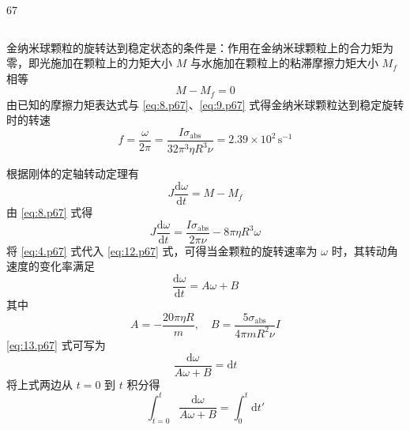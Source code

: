 \begin{solution}{67}
\begin{subsolution}
\begin{equation}
        \end{equation}
    \end{subsolution}
    \begin{subsolution}
        金纳米球颗粒的旋转达到稳定状态的条件是：作用在金纳米球颗粒上的合力矩为零，即光施加在颗粒上的力矩大小 $M$ 与水施加在颗粒上的粘滞摩擦力矩大小 $M_{f}$ 相等
        \begin{equation}
            M - M_{f} = 0 \label{eq:9.p67}
        \end{equation}
        由已知的摩擦力矩表达式与 \eqref{eq:8.p67}、\eqref{eq:9.p67} 式得金纳米球颗粒达到稳定旋转时的转速
        \begin{equation}
            f = \frac{\omega}{2\pi} = \frac{I\sigma_{\mathrm{abs}}}{32\pi^{3}\eta R^{3}\nu} = 2.39 \times 10^{2}\,\mathrm{s^{-1}} \label{eq:10.p67}
        \end{equation}
    \end{subsolution}
    \begin{subsolution}
        根据刚体的定轴转动定理有
        \begin{equation}
            J \frac{\mathrm{d}\omega}{\mathrm{d}t} = M - M_{f} \label{eq:11.p67}
        \end{equation}
        由 \eqref{eq:8.p67} 式得
        \begin{equation}
            J \frac{\mathrm{d}\omega}{\mathrm{d}t} = \frac{I\sigma_{\mathrm{abs}}}{2\pi\nu} - 8\pi\eta R^{3}\omega \label{eq:12.p67}
        \end{equation}
        将 \eqref{eq:4.p67} 式代入 \eqref{eq:12.p67} 式，可得当金颗粒的旋转速率为 $\omega$ 时，其转动角速度的变化率满足
        \begin{equation}
            \frac{\mathrm{d}\omega}{\mathrm{d}t} = A\omega + B \label{eq:13.p67}
        \end{equation}
        其中
        \begin{equation*}
            A = -\frac{20\pi\eta R}{m},\quad B = \frac{5\sigma_{\mathrm{abs}}}{4\pi m R^{2}\nu}I
        \end{equation*}
        \eqref{eq:13.p67} 式可写为
        \begin{equation*}
            \frac{\mathrm{d}\omega}{A\omega + B} = \mathrm{d}t
        \end{equation*}
        将上式两边从 $t=0$ 到 $t$ 积分得
        \begin{equation}
            \int_{t=0}^{t} \frac{\mathrm{d}\omega}{A\omega + B} = \int_{0}^{t} \mathrm{d}t' \label{eq:14.p67}
        \end{equation}

\end{subsolution}
\end{solution}
